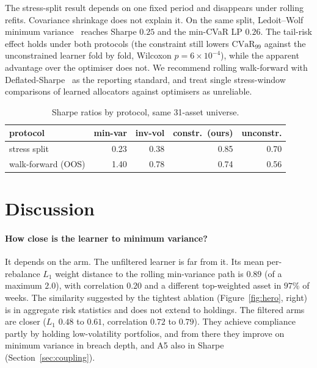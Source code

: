 \documentclass[sigconf]{acmart}
\begin{document}
The stress-split result depends on one fixed period and disappears under rolling refits.
Covariance shrinkage does not explain it. On the same split, Ledoit--Wolf minimum
variance~\cite{ledoit2004wellconditioned} reaches Sharpe $0.25$ and the min-CVaR LP $0.26$. The
tail-risk effect holds under both protocols (the constraint still lowers $\mathrm{CVaR}_{99}$
against the unconstrained learner fold by fold, Wilcoxon $p=6\times10^{-4}$), while the apparent
advantage over the optimiser does not. We recommend rolling walk-forward with
Deflated-Sharpe~\cite{bailey2014deflated} as the reporting standard, and treat single
stress-window comparisons of learned allocators against optimisers as unreliable.

\begin{table}[t]
\centering
\caption{Sharpe ratios by protocol, same 31-asset universe.}
\label{tab:protocol}
\footnotesize
\setlength{\tabcolsep}{3.5pt}
\begin{tabular}{@{}lrrrr@{}}
\toprule
protocol & min-var & inv-vol & constr.\ (ours) & unconstr. \\
\midrule
stress split       & 0.23 & 0.38 & 0.85 & 0.70 \\
walk-forward (OOS) & 1.40 & 0.78 & 0.74 & 0.56 \\
\bottomrule
\end{tabular}
\end{table}


\section{Discussion}
\label{sec:discussion}

\paragraph{How close is the learner to minimum variance?} It depends on the arm. The
unfiltered learner is far from it. Its mean per-rebalance $L_1$ weight distance to the
rolling min-variance path is $0.89$ (of a maximum $2.0$), with correlation $0.20$ and a
different top-weighted asset in $97\%$ of weeks. The similarity suggested by the tightest
ablation (Figure~\ref{fig:hero}, right) is in aggregate risk statistics and does not
extend to holdings. The filtered arms are closer ($L_1$ $0.48$ to $0.61$, correlation $0.72$ to
$0.79$). They achieve compliance partly by holding low-volatility portfolios, and from there
they improve on minimum variance in breach depth, and A5 also in Sharpe
(Section~\ref{sec:coupling}).
\end{document}
